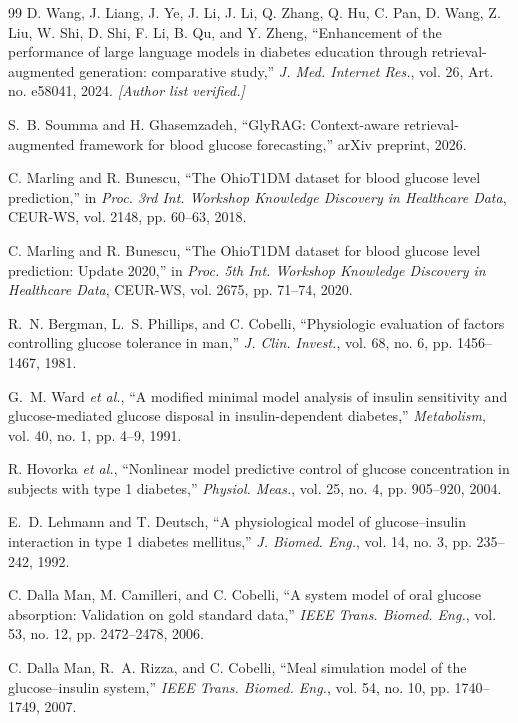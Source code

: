 \documentclass[journal]{IEEEtran}
\begin{document}
\begin{thebibliography}{99}
 D. Wang, J. Liang, J. Ye, J. Li, J. Li, Q. Zhang, Q. Hu, C. Pan, D. Wang, Z. Liu, W. Shi, D. Shi, F. Li, B. Qu, and Y. Zheng, ``Enhancement of the performance of large language models in diabetes education through retrieval-augmented generation: comparative study,'' \emph{J. Med. Internet Res.}, vol. 26, Art. no. e58041, 2024. \emph{[Author list verified.]}

 S.~B. Soumma and H. Ghasemzadeh, ``GlyRAG: Context-aware retrieval-augmented framework for blood glucose forecasting,'' arXiv preprint, 2026.

 C. Marling and R. Bunescu, ``The OhioT1DM dataset for blood glucose level prediction,'' in \emph{Proc. 3rd Int. Workshop Knowledge Discovery in Healthcare Data}, CEUR-WS, vol. 2148, pp. 60--63, 2018.

 C. Marling and R. Bunescu, ``The OhioT1DM dataset for blood glucose level prediction: Update 2020,'' in \emph{Proc. 5th Int. Workshop Knowledge Discovery in Healthcare Data}, CEUR-WS, vol. 2675, pp. 71--74, 2020.

 R.~N. Bergman, L.~S. Phillips, and C. Cobelli, ``Physiologic evaluation of factors controlling glucose tolerance in man,'' \emph{J. Clin. Invest.}, vol. 68, no. 6, pp. 1456--1467, 1981.

 G.~M. Ward \emph{et al.}, ``A modified minimal model analysis of insulin sensitivity and glucose-mediated glucose disposal in insulin-dependent diabetes,'' \emph{Metabolism}, vol. 40, no. 1, pp. 4--9, 1991.

 R. Hovorka \emph{et al.}, ``Nonlinear model predictive control of glucose concentration in subjects with type 1 diabetes,'' \emph{Physiol. Meas.}, vol. 25, no. 4, pp. 905--920, 2004.

 E.~D. Lehmann and T. Deutsch, ``A physiological model of glucose--insulin interaction in type 1 diabetes mellitus,'' \emph{J. Biomed. Eng.}, vol. 14, no. 3, pp. 235--242, 1992.

 C. Dalla Man, M. Camilleri, and C. Cobelli, ``A system model of oral glucose absorption: Validation on gold standard data,'' \emph{IEEE Trans. Biomed. Eng.}, vol. 53, no. 12, pp. 2472--2478, 2006.

 C. Dalla Man, R.~A. Rizza, and C. Cobelli, ``Meal simulation model of the glucose--insulin system,'' \emph{IEEE Trans. Biomed. Eng.}, vol. 54, no. 10, pp. 1740--1749, 2007.


\end{thebibliography}
\end{document}
